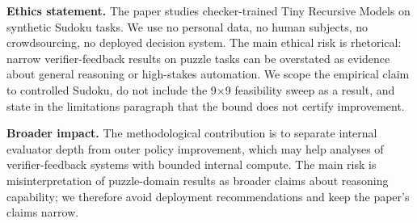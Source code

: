 \documentclass{article}
\theoremstyle{plain}
\theoremstyle{definition}
\theoremstyle{remark}
\begin{document}
\textbf{Ethics statement.}
The paper studies checker-trained Tiny Recursive Models on synthetic Sudoku tasks. We use no personal data, no human subjects, no crowdsourcing, no deployed decision system. The main ethical risk is rhetorical: narrow verifier-feedback results on puzzle tasks can be overstated as evidence about general reasoning or high-stakes automation. We scope the empirical claim to controlled Sudoku, do not include the 9$\times$9 feasibility sweep as a result, and state in the limitations paragraph that the bound does not certify improvement.

\textbf{Broader impact.}
The methodological contribution is to separate internal evaluator depth from outer policy improvement, which may help analyses of verifier-feedback systems with bounded internal compute. The main risk is misinterpretation of puzzle-domain results as broader claims about reasoning capability; we therefore avoid deployment recommendations and keep the paper's claims narrow.
\end{document}
